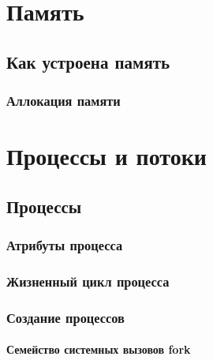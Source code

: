 \documentclass[oneside]{book}
\begin{document}

\part{Память}
%

	\chapter{Как устроена память}
	

		\section{Аллокация памяти}
		
	
	
\part{Процессы и потоки}
%	

	\chapter{Процессы}
	
	
		\section{Атрибуты процесса}
		

		\section{Жизненный цикл процесса}
		

		\section{Создание процессов}
		

			\subsection{Семейство системных вызовов fork}
			
\end{document}
